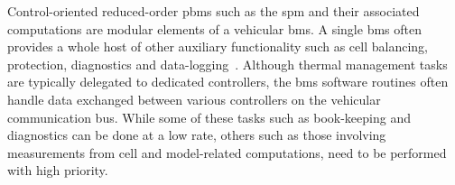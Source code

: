 Control-oriented  reduced-order  \glspl{pbm} such  as  the  \gls{spm} and  their
associated computations are modular elements  of a vehicular \gls{bms}. A single
\gls{bms}  often provides  a whole  host of  other auxiliary  functionality such
as  cell balancing,  protection, diagnostics  and data-logging~\cite{Plett2016}.
Although  thermal   management  tasks  are  typically   delegated  to  dedicated
controllers, the \gls{bms} software routines often handle data exchanged between
various  controllers on  the vehicular  communication bus.  While some  of these
tasks such  as book-keeping and  diagnostics can be done  at a low  rate, others
such as those  involving measurements from cell  and model-related computations,
need to be performed with high priority.

\begin{figure}[!tbp]
\end{figure}
